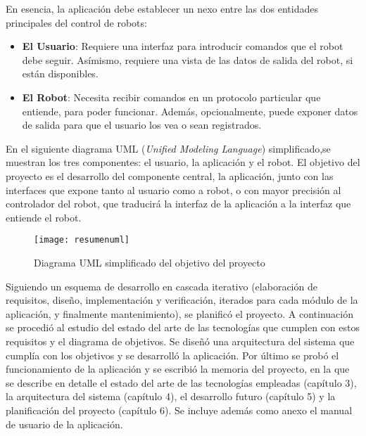 En esencia, la aplicación debe establecer un nexo entre las dos entidades principales del control de robots:
\begin{itemize}
	\item \textbf{El Usuario}: Requiere una interfaz para introducir comandos que el robot debe seguir. Asímismo, requiere una 
	vista de las datos de salida del robot, si están disponibles.
	\item \textbf{El Robot}: Necesita recibir comandos en un protocolo particular que entiende, para poder funcionar. Además, 
	opcionalmente, puede exponer datos de salida para que el usuario los vea o sean registrados.
\end{itemize}
En el siguiente diagrama UML (\textit{Unified Modeling Language}) simplificado,se muestran los tres componentes: el usuario, la 
aplicación y el robot. El objetivo del proyecto es el desarrollo del componente central, la aplicación, junto con las interfaces 
que expone tanto al usuario como a robot, o con mayor precisión al controlador del robot, que traducirá la interfaz de la 
aplicación a la interfaz que entiende el robot.
\begin{figure}[H]
\centering
\captionsetup{justification=centering}
\texttt{[image: resumenuml]}
\caption{Diagrama UML simplificado del objetivo del proyecto}
\end{figure}

Siguiendo un esquema de desarrollo en cascada iterativo (elaboración de requisitos, diseño, implementación y verificación, 
iterados para cada módulo de la aplicación, y finalmente mantenimiento), se planificó el proyecto. A continuación se procedió al 
estudio del estado del arte de las tecnologías que cumplen con estos requisitos y el diagrama de objetivos. Se diseñó una 
arquitectura del sistema que cumplía con los objetivos y se desarrolló la aplicación. Por último se probó el funcionamiento de la 
aplicación y se escribió la memoria del proyecto, en la que se describe en detalle el estado del arte de las tecnologías 
empleadas (capítulo 3), la arquitectura del sistema (capítulo 4), el desarrollo futuro (capítulo 5) y la planificación del 
proyecto (capítulo 6). Se incluye además como anexo el manual de usuario de la aplicación.\\

